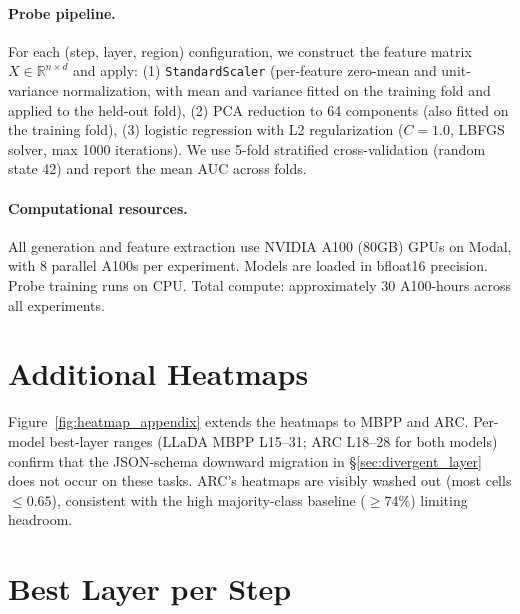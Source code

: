 \documentclass[11pt]{article}
\begin{document}
\paragraph{Probe pipeline.}
For each (step, layer, region) configuration, we construct the feature matrix $X \in \mathbb{R}^{n \times d}$ and apply:
(1) \texttt{StandardScaler} (per-feature zero-mean and unit-variance normalization, with mean and variance fitted on the training fold and applied to the held-out fold),
(2) PCA reduction to 64 components (also fitted on the training fold),
(3) logistic regression with L2 regularization ($C = 1.0$, LBFGS solver, max 1000 iterations).
We use 5-fold stratified cross-validation (random state 42) and report the mean AUC across folds.

\paragraph{Computational resources.}
All generation and feature extraction use NVIDIA A100 (80GB) GPUs on Modal, with 8 parallel A100s per experiment.
Models are loaded in bfloat16 precision.
Probe training runs on CPU.
Total compute: approximately 30 A100-hours across all experiments.


\section{Additional Heatmaps}
\label{sec:appendix_heatmap}

Figure~\ref{fig:heatmap_appendix} extends the heatmaps to MBPP and ARC. Per-model best-layer ranges (LLaDA MBPP L15--31; ARC L18--28 for both models) confirm that the JSON-schema downward migration in \S\ref{sec:divergent_layer} does not occur on these tasks. ARC's heatmaps are visibly washed out (most cells $\leq 0.65$), consistent with the high majority-class baseline ($\geq 74\%$) limiting headroom.

\section{Best Layer per Step}
\label{sec:appendix_layer}
\end{document}

